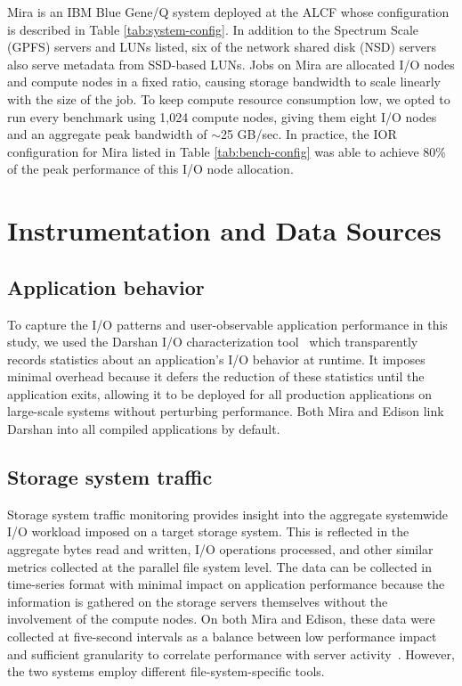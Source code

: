Mira is an IBM Blue Gene/Q system deployed at the ALCF whose configuration is described in Table \ref{tab:system-config}.
In addition to the Spectrum Scale (GPFS) servers and LUNs listed, six of the network shared disk (NSD) servers also serve metadata from SSD-based LUNs.
Jobs on Mira are allocated I/O nodes and compute nodes in a fixed ratio, causing storage bandwidth to scale linearly with the size of the job.
To keep compute resource consumption low, we opted to run every benchmark using 1,024 compute nodes, giving them eight I/O nodes and an aggregate peak bandwidth of $\sim$25 GB/sec.
In practice, the IOR configuration for Mira listed in Table \ref{tab:bench-config} was able to achieve 80\% of the peak performance of this I/O node allocation.

\section{Instrumentation and Data Sources} \label{sec:methods}


\subsection{Application behavior} \label{sec:methods/darshan}

To capture the I/O patterns and user-observable application performance in this study, we used the Darshan I/O characterization tool~\cite{carns200924} which transparently records statistics about an application's I/O behavior at runtime.
It imposes minimal overhead because it defers the reduction of these statistics until the application exits,
allowing it to be deployed for all production applications on large-scale systems without perturbing performance.  Both Mira and Edison link Darshan into all compiled applications by default.

\subsection{Storage system traffic} \label{sec:methods/storagesystraffic}

Storage system traffic monitoring provides insight into the aggregate systemwide I/O workload imposed on a target storage system.
This is reflected in the aggregate bytes read and written, I/O operations processed, and other similar metrics collected at the parallel file system level.
The data can be collected in time-series format with minimal impact on application performance because the information is gathered on the storage servers themselves without the involvement of the compute nodes.
On both Mira and Edison, these data were collected at five-second intervals as a balance between low performance impact and sufficient granularity to correlate performance with server activity~\cite{madireddy2017}.  However, the two systems employ different file-system-specific tools.  

